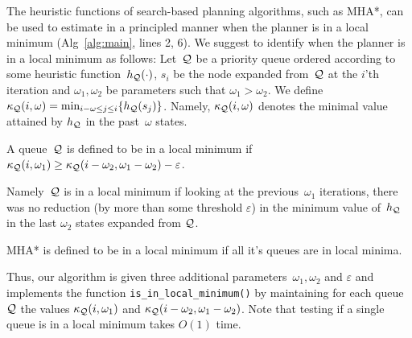 \documentclass[conference]{IEEEtran}
\begin{document}
The heuristic functions of search-based planning algorithms, such as MHA*, can be used to estimate in a principled manner when the planner is in a local minimum (Alg~\ref{alg:main}, lines 2, 6). 
%
We suggest to identify when the planner is in a local minimum as follows:
Let~$\mathcal{Q}$ be a priority queue 
ordered according to some heuristic function~$h_{\mathcal{Q}}(\cdot)$,
$s_i$ be the node expanded from~$\mathcal{Q}$ at the $i$'th iteration and $\omega_1, \omega_2$ be parameters such that $\omega_1 > \omega_2$.
%
We define 
$\kappa_{\mathcal{Q}}(i, \omega) = \min_{i-\omega \leq j \leq i} \{ h_{\mathcal{Q}}(s_j)\}$.
Namely, $\kappa_{\mathcal{Q}}(i, \omega)$ denotes the minimal value attained by $h_{\mathcal{Q}}$ in the past~$\omega$ states. 
%
\begin{definition}
A queue~$\mathcal{Q}$ is defined to be in a local minimum if 
$\kappa_{\mathcal{Q}}(i, \omega_1) \geq \kappa_{\mathcal{Q}}(i - \omega_2, \omega_1 - \omega_2) - \varepsilon$.
\end{definition}
\noindent Namely~$\mathcal{Q}$ is in a local minimum if looking at the previous~$\omega_1$ iterations, 
there was no reduction 
(by more than some threshold $\varepsilon$) 
in the minimum value of~$h_{\mathcal{Q}}$ 
in the last $\omega_2$ states expanded from $\mathcal{Q}$.

\begin{definition}
MHA* is defined to be in a local minimum if 
all it's queues are in local minima.
\end{definition}

Thus, our algorithm is given three additional parameters~$\omega_1, \omega_2$ and $\varepsilon$ 
and implements the function \texttt{is\_in\_local\_minimum()} by maintaining for each queue~$\mathcal{Q}$ the values 
$\kappa_{\mathcal{Q}}(i, \omega_1)$ and $\kappa_{\mathcal{Q}}(i - \omega_2, \omega_1 - \omega_2)$.
Note that testing if a single queue is in a local minimum takes $O(1)$ time.




%
\end{document}
